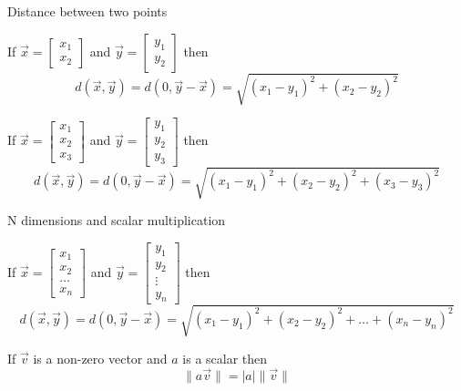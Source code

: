 \documentclass{beamer}
\begin{document}
\begin{frame}{Distance between two points}
  \begin{definition}
    If $\vec{x} =
    \left[
      \begin{array}{c}
        x_1\\
        x_2
      \end{array}
    \right]$ and $\vec{y} =
    \left[
      \begin{array}{c}
        y_1\\
        y_2
      \end{array}
    \right]$
    then $$d(\vec{x}, \vec{y}) = d(0, \vec{y}-\vec{x}) = \sqrt{(x_1-y_1)^2+(x_2-y_2)^2}$$
  \end{definition}
 \begin{definition}
    If $\vec{x} =
    \left[
      \begin{array}{c}
        x_1\\
        x_2\\
        x_3
      \end{array}
    \right]$ and $\vec{y} =
    \left[
      \begin{array}{c}
        y_1\\
        y_2\\
        y_3
      \end{array}
    \right]$
    then $$d(\vec{x}, \vec{y}) = d(0, \vec{y}-\vec{x}) = \sqrt{(x_1-y_1)^2+(x_2-y_2)^2+(x_3-y_3)^2}$$
  \end{definition}   
\end{frame}

\begin{frame}{N dimensions and scalar multiplication}
  \begin{definition}[n dimensions]
    If $\vec{x} =
      \left[
	\begin{array}{c}
          x_1\\
          x_2\\
          \dots\\
          x_n
	\end{array}
      \right]$ and $\vec{y} =
      \left[
	\begin{array}{c}
          y_1\\
          y_2\\
          \vdots\\
          y_n
	\end{array}
      \right]$
      then $$d(\vec{x}, \vec{y}) = d(0, \vec{y}-\vec{x}) = \sqrt{(x_1-y_1)^2+(x_2-y_2)^2+\dots +(x_n-y_n)^2}$$
    \end{definition}
    \begin{lemma}
      If $\vec{v}$ is a non-zero vector and $a$ is a scalar then
      \begin{equation*}
        \|a\vec{v}\| = |a|\|\vec{v}\|
      \end{equation*}
    \end{lemma}
\end{frame}
\end{document}
